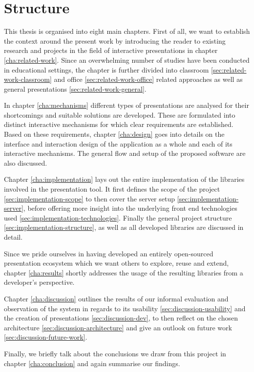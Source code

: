 
\section{Structure}

This thesis is organised into eight main chapters. First of all, we want to establish the context around the present work by introducing the reader to existing research and projects in the field of interactive presentations in chapter \ref{cha:related-work}. Since an overwhelming number of studies have been conducted in educational settings, the chapter is further divided into classroom \ref{sec:related-work-classroom} and office \ref{sec:related-work-office} related approaches as well as general presentations \ref{sec:related-work-general}.

In chapter \ref{cha:mechanisms} different types of presentations are analysed for their shortcomings and suitable solutions are developed. These are formulated into distinct interactive mechanisms for which clear requirements are established.
Based on these requirements, chapter \ref{cha:design} goes into details on the interface and interaction design of the application as a whole and each of its interactive mechanisms. The general flow and setup of the proposed software are also discussed.

Chapter \ref{cha:implementation} lays out the entire implementation of the libraries involved in the presentation tool. It first defines the scope of the project \ref{sec:implementation-scope} to then cover the server setup \ref{sec:implementation-server}, before offering more insight into the underlying front end technologies used \ref{sec:implementation-technologies}. Finally the general project structure \ref{sec:implementation-structure}, as well as all developed libraries are discussed in detail.

Since we pride ourselves in having developed an entirely open-sourced presentation ecosystem which we want others to explore, reuse and extend, chapter \ref{cha:results} shortly addresses the usage of the resulting libraries from a developer's perspective.

Chapter \ref{cha:discussion} outlines the results of our informal evaluation and observation of the system in regards to its usability \ref{sec:discussion-usability} and the creation of presentations \ref{sec:discussion-dev}, to then reflect on the chosen architecture \ref{sec:discussion-architecture} and give an outlook on future work \ref{sec:discussion-future-work}.

Finally, we briefly talk about the conclusions we draw from this project in chapter \ref{cha:conclusion} and again summarise our findings.